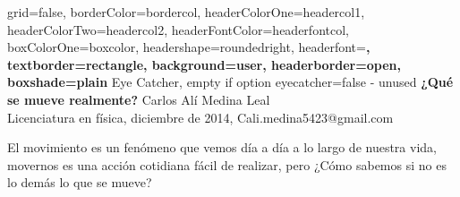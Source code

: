 \documentclass[a0paper,portrait]{baposter}
\begin{document}
\begin{poster}{
	grid=false,
	borderColor=bordercol,
	headerColorOne=headercol1,
	headerColorTwo=headercol2,
	headerFontColor=headerfontcol,
	boxColorOne=boxcolor,
	headershape=roundedright,
	headerfont=\Large\sf\bf,
	textborder=rectangle,
	background=user,
	headerborder=open,
  boxshade=plain
}
{
	Eye Catcher, empty if option eyecatcher=false - unused
}
{\sf\bf
	¿Qué se mueve realmente?
}
{
	\vspace{1em} Carlos Alí Medina Leal\\
	{\smaller  Licenciatura en física, diciembre de 2014, Cali.medina5423@gmail.com}
}
{
\setlength\fboxsep{0pt}
\setlength\fboxrule{0pt}
}

{
El movimiento es un fenómeno que vemos día a día a lo largo de nuestra vida, movernos es una acción cotidiana fácil de realizar, pero  ¿Cómo sabemos si no es lo demás lo que se mueve?

}
\end{poster}
\end{document}
